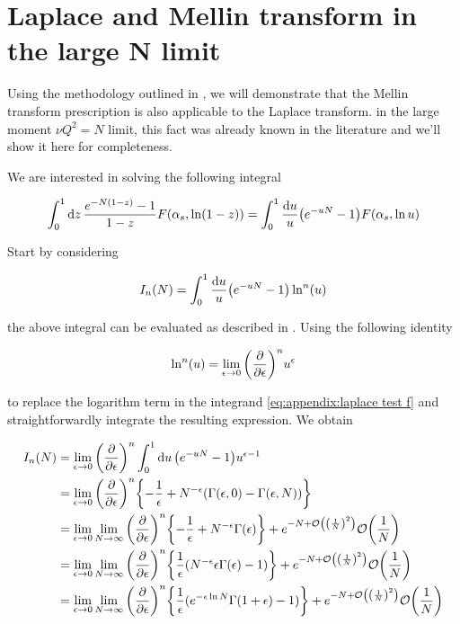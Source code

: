\documentclass[../main.tex]{subfiles}
\begin{document}
\section{Laplace and Mellin transform in the large N limit} \label{Appendix: Laplace and Mellin transform}

Using the methodology outlined in \cite{Catani_2003_appendix}, we will demonstrate that the Mellin transform prescription is also applicable to the Laplace transform.
in the large moment $\nu Q^2 = N$ limit, this fact was already known in the literature \cite{CATAN_large_chi} and we'll show it here for completeness.

We are interested in solving the following integral

\begin{equation}
    \int_0^1 \dd{z} \frac{e^{- N (1-z)} - 1}{1-z} F\qty(\alpha_s,\ln(1-z))= \int_0^1 \frac{\dd{u}}{u} \qty(e^{-u N} - 1) F\qty(\alpha_s , \ln u)
\end{equation}

Start by considering 

\begin{equation}\label{eq:appendix:laplace test f}
    I_n(N) = \int_0^1 \frac{\dd{u}}{u} \qty(e^{-u N} - 1) \ln^n(u) 
\end{equation}

the above integral can be evaluated as described in \cite{CATANI1989323}. Using the following identity

\begin{equation}
    \ln^n(u)= \lim_{\epsilon \to 0} \qty(\pdv{\epsilon})^n u^\epsilon
\end{equation}

to replace the logarithm term in the integrand \cref{eq:appendix:laplace test f} and straightforwardly integrate the resulting expression. We obtain

\begin{align}
    \begin{split}\label{eq:appendix:calculation}
    I_n(N) &= \lim_{\epsilon \to 0} \qty(\pdv{\epsilon})^n \int_0^1 \dd{u} \qty(e^{-u N} - 1) u^{\epsilon-1} \\
    &= \lim_{\epsilon \to 0} \qty(\pdv{\epsilon})^n \qty{-\frac{1}{\epsilon}+N^{-\epsilon} (\Gamma(\epsilon,0) - \Gamma(\epsilon,N))} \\
    &= \lim_{\epsilon \to 0} \lim_{N \to \infty} \qty(\pdv{\epsilon})^n \qty{-\frac{1}{\epsilon}+N^{-\epsilon} \Gamma(\epsilon)}+ e^{-N + \order{\qty(\frac{1}{N})^2}}\order{\frac{1}{N}} \\
    &= \lim_{\epsilon \to 0} \lim_{N \to \infty} \qty(\pdv{\epsilon})^n \qty{\frac{1}{\epsilon} (N^{-\epsilon} \epsilon \Gamma(\epsilon) -1)} + e^{-N + \order{\qty(\frac{1}{N})^2}}\order{\frac{1}{N}}\\
    &= \lim_{\epsilon \to 0} \lim_{N \to \infty} \qty(\pdv{\epsilon})^n \qty{\frac{1}{\epsilon} ( e^{-\epsilon \ln N} \Gamma(1+\epsilon) -1)} + e^{-N + \order{\qty(\frac{1}{N})^2}}\order{\frac{1}{N}}
    \end{split}
\end{align}
\end{document}
